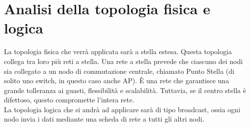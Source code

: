 \section{Analisi della topologia fisica e logica}
\hspace{24pt}La topologia fisica che verrà applicata sarà a stella estesa. Questa topologia collega tra loro più reti a stella. Una rete a stella prevede che ciascuno dei nodi sia collegato a un nodo di commutazione centrale, chiamato Punto Stella (di solito uno switch, in questo caso anche AP). È una rete che garantisce una grande tolleranza ai guasti, flessibilità e scalabilità. Tuttavia, se il centro stella è difettoso, questo compromette l'intera rete.\\
\hspace{24pt}La topologia logica che si andrà ad applicare sarà di tipo broadcast, ossia ogni nodo invia i dati mediante una scheda di rete a tutti gli altri nodi.